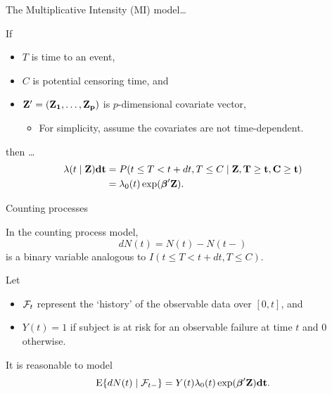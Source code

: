 \documentclass[ignorenonframetext,]{beamer}
\providecommand{\tightlist}{%
  \setlength{\itemsep}{0pt}\setlength{\parskip}{0pt}}
\newcommand{\bbeta}{\mbox{\boldmath$\beta$}}
\newcommand{\bZ}{\bf Z}
\begin{document}
\begin{frame}{%
\protect\hypertarget{the-multiplicative-intensity-mi-model-1}{%
The Multiplicative Intensity (MI) model\ldots}}

If

\begin{itemize}
\item
  \(T\) is time to an event,\\
\item
  \(C\) is potential censoring time, and
\item
  \(\bZ^\prime = (Z_1,\ldots, Z_p)\) is \(p\)-dimensional covariate
  vector,

  \begin{itemize}
  \tightlist
  \item
    For simplicity, assume the covariates are not time-dependent.
  \end{itemize}
\end{itemize}

then \ldots \begin{align*}
\lambda(t \mid \bZ )dt &=  P (t \leq T < t+dt, T \leq C
    \mid \bZ, T \ge t, C \ge t) \\
&= \lambda_0(t) \exp(\bbeta^\prime \bZ).
\end{align*}

\end{frame}

\begin{frame}{%
\protect\hypertarget{counting-processes}{%
Counting processes}}

In the counting process model, \[
    dN(t) = N(t) - N(t-)
\] is a binary variable analogous to \(I(t \leq T < t + dt, T \leq C)\).

Let

\begin{itemize}
\item
  \({\cal F}_t\) represent the `history’ of the observable data over
  \([0,t]\), and
\item
  \(Y(t) = 1\) if subject is at risk for an observable failure at time
  \(t\) and 0 otherwise.
\end{itemize}

It is reasonable to model \[
    \mbox{E} \{dN(t) \mid {\cal F}_{t-}\} = Y(t) \lambda_0 (t)  
        \exp(\bbeta^\prime \bZ) dt.
\]

\end{frame}
\end{document}
